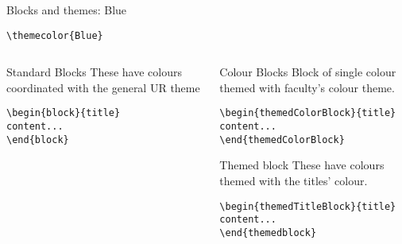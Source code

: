 \begingroup
{}
\begin{frame}[fragile]{Blocks and themes: Blue}
    \begin{center}\verb|\themecolor{Blue}|\end{center}
\begin{columns} %
\begin{column}{0.3\textwidth}
\begin{block}{Standard Blocks}
These have colours coordinated with the general UR theme
\begin{verbatim}
\begin{block}{title}
content...
\end{block}
\end{verbatim}
\end{block}
\end{column}
\begin{column}{0.7\textwidth}
\begin{themedColorBlock}{Colour Blocks}
Block of single colour themed with faculty's colour theme.
\small
\begin{verbatim}
\begin{themedColorBlock}{title}
content...
\end{themedColorBlock}
\end{verbatim}
\end{themedColorBlock}
\begin{themedTitleBlock} {Themed block}
These have colours themed with the titles' colour.
\small
\begin{verbatim}
\begin{themedTitleBlock}{title}
content...
\end{themedblock}
\end{verbatim}
\end{themedTitleBlock}
\end{column}
\end{columns}
\end{frame}
\endgroup